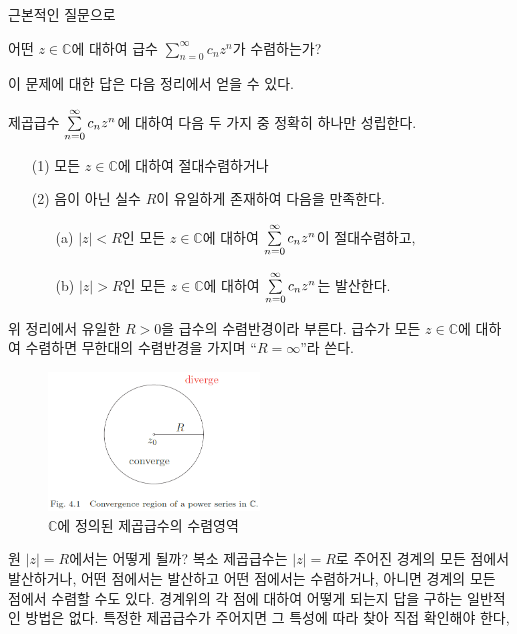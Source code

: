 근본적인 질문으로 
\begin{center}
어떤 $z\in\mathbb C$에 대하여  급수 $\sum_{n=0}^\infty c_nz^n$가 수렴하는가?
\end{center}

이 문제에 대한 답은 다음 정리에서 얻을 수 있다.

\begin{salt_theorem} \label{thm-4-1}
제곱급수 $\sum\limits_{n=0}^\infty c_nz^n$에 대하여
다음 두 가지 중 정확히 하나만 성립한다.
\begin{itemize}
\item[(1)] 모든 $z\in\mathbb C$에 대하여 절대수렴하거나
\item[(2)] 음이 아닌 실수 $R$이 유일하게 존재하여 다음을 만족한다.
\begin{itemize}
\item[(a)] $|z|<R$인 모든 $z\in\mathbb C$에 대하여 $\sum\limits_{n=0}^\infty c_nz^n$이 절대수렴하고,
\item[(b)] $|z|>R$인 모든 $z\in\mathbb C$에 대하여 $\sum\limits_{n=0}^\infty c_nz^n$는 발산한다.
\end{itemize}
\end{itemize}
\end{salt_theorem}

위 정리에서 유일한 $R>0$을 급수의 수렴반경이라 부른다.
급수가 모든 $z\in\mathbb C$에 대하여 수렴하면
무한대의 수렴반경을 가지며 ``$R=\infty$''라 쓴다.

\begin{figure}[h!]
\begin{center}
\includegraphics[width=0.5\textwidth]{./SaltChapter/fig-4-1}
\end{center}
\caption{$\mathbb C$에 정의된 제곱급수의 수렴영역}
\label{fig-4-1}
\end{figure}

원 $|z|=R$에서는 어떻게 될까?
복소 제곱급수는 $|z|=R$로 주어진 경계의 모든 점에서 발산하거나,
어떤 점에서는 발산하고 어떤 점에서는 수렴하거나,
아니면 경계의 모든 점에서 수렴할 수도 있다.
경계위의 각 점에 대하여 어떻게 되는지 답을 구하는 일반적인 방법은 없다.
특정한 제곱급수가 주어지면 그 특성에 따라 찾아 직접 확인해야 한다,

